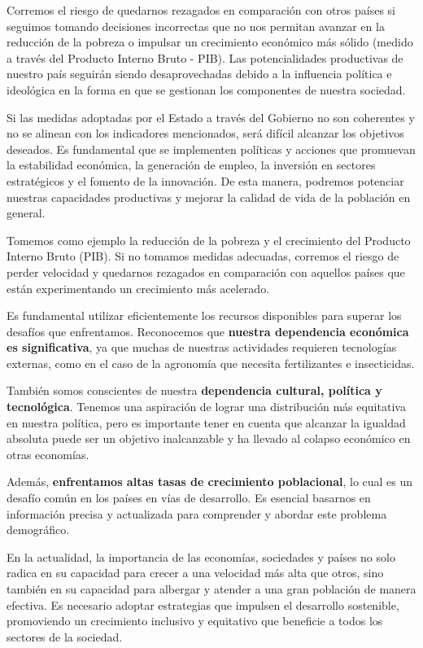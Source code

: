 \documentclass[
  jou,
  floatsintext,
  longtable,
  a4paper,
  nolmodern,
  notxfonts,
  notimes,
  12pt,
  colorlinks=true,linkcolor=blue,citecolor=blue,urlcolor=blue]{apa7}
\begin{document}
Corremos el riesgo de quedarnos rezagados en comparación con otros
países si seguimos tomando decisiones incorrectas que no nos permitan
avanzar en la reducción de la pobreza o impulsar un crecimiento
económico más sólido (medido a través del Producto Interno Bruto - PIB).
Las potencialidades productivas de nuestro país seguirán siendo
desaprovechadas debido a la influencia política e ideológica en la forma
en que se gestionan los componentes de nuestra sociedad.

Si las medidas adoptadas por el Estado a través del Gobierno no son
coherentes y no se alinean con los indicadores mencionados, será difícil
alcanzar los objetivos deseados. Es fundamental que se implementen
políticas y acciones que promuevan la estabilidad económica, la
generación de empleo, la inversión en sectores estratégicos y el fomento
de la innovación. De esta manera, podremos potenciar nuestras
capacidades productivas y mejorar la calidad de vida de la población en
general.

Tomemos como ejemplo la reducción de la pobreza y el crecimiento del
Producto Interno Bruto (PIB). Si no tomamos medidas adecuadas, corremos
el riesgo de perder velocidad y quedarnos rezagados en comparación con
aquellos países que están experimentando un crecimiento más acelerado.

Es fundamental utilizar eficientemente los recursos disponibles para
superar los desafíos que enfrentamos. Reconocemos que \textbf{nuestra
dependencia económica es significativa}, ya que muchas de nuestras
actividades requieren tecnologías externas, como en el caso de la
agronomía que necesita fertilizantes e insecticidas.

También somos conscientes de nuestra \textbf{dependencia cultural,
política y tecnológica}. Tenemos una aspiración de lograr una
distribución más equitativa en nuestra política, pero es importante
tener en cuenta que alcanzar la igualdad absoluta puede ser un objetivo
inalcanzable y ha llevado al colapso económico en otras economías.

Además, \textbf{enfrentamos altas tasas de crecimiento poblacional}, lo
cual es un desafío común en los países en vías de desarrollo. Es
esencial basarnos en información precisa y actualizada para comprender y
abordar este problema demográfico.

En la actualidad, la importancia de las economías, sociedades y países
no solo radica en su capacidad para crecer a una velocidad más alta que
otros, sino también en su capacidad para albergar y atender a una gran
población de manera efectiva. Es necesario adoptar estrategias que
impulsen el desarrollo sostenible, promoviendo un crecimiento inclusivo
y equitativo que beneficie a todos los sectores de la sociedad.
\end{document}
